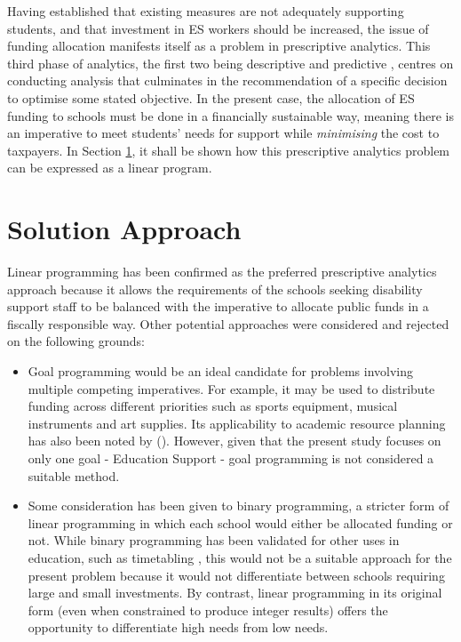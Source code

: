 \documentclass[11pt, a4paper]{article}
\begin{document}
    Having established that existing measures are not adequately supporting students, and that investment in ES workers should be increased, the issue of funding allocation manifests itself as a problem in prescriptive analytics. This third phase of analytics, the first two being descriptive and predictive \parencite{analytics}, centres on conducting analysis that culminates in the recommendation of a specific decision to optimise some stated objective. In the present case, the allocation of ES funding to schools must be done in a financially sustainable way, meaning there is an imperative to meet students' needs for support while \textit{minimising} the cost to taxpayers. In Section \ref{solution_approach}, it shall be shown how this prescriptive analytics problem can be expressed as a linear program.

    \section{Solution Approach} \label{solution_approach}

    Linear programming has been confirmed as the preferred prescriptive analytics approach because it allows the requirements of the schools seeking disability support staff to be balanced with the imperative to allocate public funds in a fiscally responsible way. Other potential approaches were considered and rejected on the following grounds:

    \begin{itemize}
        \item Goal programming would be an ideal candidate for problems involving multiple competing imperatives. For example, it may be used to distribute funding across different priorities such as sports equipment, musical instruments and art supplies. Its applicability to academic resource planning has also been noted by  (). However, given that the present study focuses on only one goal - Education Support - goal programming is not considered a suitable method.
        \item Some consideration has been given to binary programming, a stricter form of linear programming in which each school would either be allocated funding or not. While binary programming has been validated for other uses in education, such as timetabling \parencite{binary_prog}, this would not be a suitable approach for the present problem because it would not differentiate between schools requiring large and small investments. By contrast, linear programming in its original form (even when constrained to produce integer results) offers the opportunity to differentiate high needs from low needs.
    \end{itemize}
\end{document}
